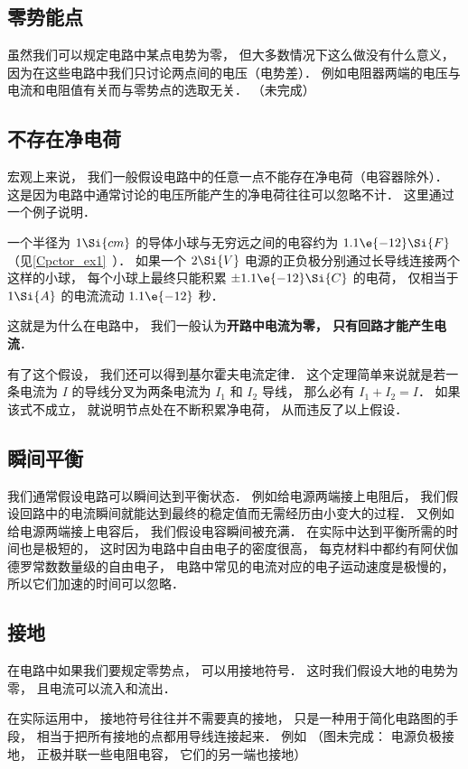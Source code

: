 
\begin{issues}
\issueDraft
\end{issues}


\subsection{零势能点}
虽然我们可以规定电路中某点电势为零， 但大多数情况下这么做没有什么意义， 因为在这些电路中我们只讨论两点间的电压（电势差）． 例如电阻器两端的电压与电流和电阻值有关而与零势点的选取无关．
（未完成）

\subsection{不存在净电荷}
宏观上来说， 我们一般假设电路中的任意一点不能存在净电荷（电容器除外）． 这是因为电路中通常讨论的电压所能产生的净电荷往往可以忽略不计． 这里通过一个例子说明．

\begin{example}{}
一个半径为 $1\Si{cm}$ 的导体小球与无穷远之间的电容约为 $1.1\e{-12} \Si{F}$（见\autoref{Cpctor_ex1}~）． 如果一个 $2\Si{V}$ 电源的正负极分别通过长导线连接两个这样的小球， 每个小球上最终只能积累 $\pm 1.1\e{-12} \Si{C}$ 的电荷， 仅相当于 $1\Si{A}$ 的电流流动 $1.1\e{-12}$ 秒．
\end{example}
这就是为什么在电路中， 我们一般认为\textbf{开路中电流为零， 只有回路才能产生电流}．

有了这个假设， 我们还可以得到基尔霍夫电流定律． 这个定理简单来说就是若一条电流为 $I$ 的导线分叉为两条电流为 $I_1$ 和 $I_2$ 导线， 那么必有 $I_1 + I_2 = I$． 如果该式不成立， 就说明节点处在不断积累净电荷， 从而违反了以上假设．

\subsection{瞬间平衡}
我们通常假设电路可以瞬间达到平衡状态． 例如给电源两端接上电阻后， 我们假设回路中的电流瞬间就能达到最终的稳定值而无需经历由小变大的过程． 又例如给电源两端接上电容后， 我们假设电容瞬间被充满． 在实际中达到平衡所需的时间也是极短的， 这时因为电路中自由电子的密度很高， 每克材料中都约有阿伏伽德罗常数数量级的自由电子， 电路中常见的电流对应的电子运动速度是极慢的， 所以它们加速的时间可以忽略．

\subsection{接地}
在电路中如果我们要规定零势点， 可以用接地符号． 这时我们假设大地的电势为零， 且电流可以流入和流出．

在实际运用中， 接地符号往往并不需要真的接地， 只是一种用于简化电路图的手段， 相当于把所有接地的点都用导线连接起来． 例如
（图未完成： 电源负极接地， 正极并联一些电阻电容， 它们的另一端也接地）
